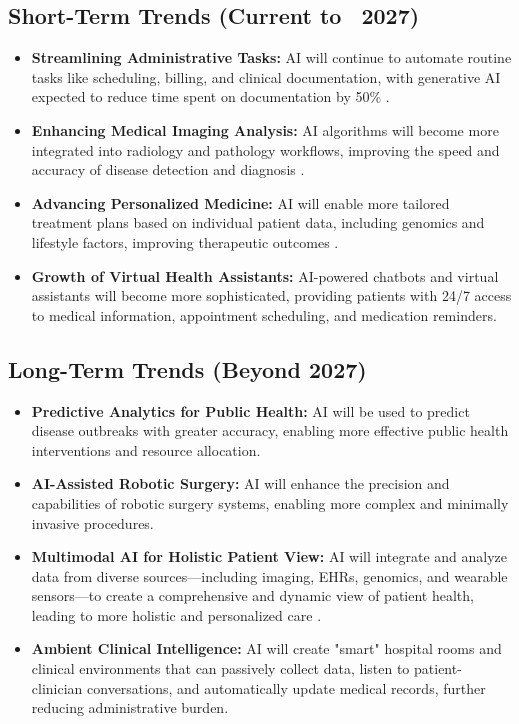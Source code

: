\subsection{Short-Term Trends (Current to ~2027)}
\begin{itemize}
    \item \textbf{Streamlining Administrative Tasks:} AI will continue to automate routine tasks like scheduling, billing, and clinical documentation, with generative AI expected to reduce time spent on documentation by 50\% \cite{NIH_FutureTrends, Keragon_AIBenefits}.
    \item \textbf{Enhancing Medical Imaging Analysis:} AI algorithms will become more integrated into radiology and pathology workflows, improving the speed and accuracy of disease detection and diagnosis \cite{MedicalBuyer_FutureTrends}.
    \item \textbf{Advancing Personalized Medicine:} AI will enable more tailored treatment plans based on individual patient data, including genomics and lifestyle factors, improving therapeutic outcomes \cite{Cpluz_FutureTrends}.
    \item \textbf{Growth of Virtual Health Assistants:} AI-powered chatbots and virtual assistants will become more sophisticated, providing patients with 24/7 access to medical information, appointment scheduling, and medication reminders.
\end{itemize}

\subsection{Long-Term Trends (Beyond 2027)}
\begin{itemize}
    \item \textbf{Predictive Analytics for Public Health:} AI will be used to predict disease outbreaks with greater accuracy, enabling more effective public health interventions and resource allocation.
    \item \textbf{AI-Assisted Robotic Surgery:} AI will enhance the precision and capabilities of robotic surgery systems, enabling more complex and minimally invasive procedures.
    \item \textbf{Multimodal AI for Holistic Patient View:} AI will integrate and analyze data from diverse sources—including imaging, EHRs, genomics, and wearable sensors—to create a comprehensive and dynamic view of patient health, leading to more holistic and personalized care \cite{Intersog_FutureTrends}.
    \item \textbf{Ambient Clinical Intelligence:} AI will create "smart" hospital rooms and clinical environments that can passively collect data, listen to patient-clinician conversations, and automatically update medical records, further reducing administrative burden.
\end{itemize}

